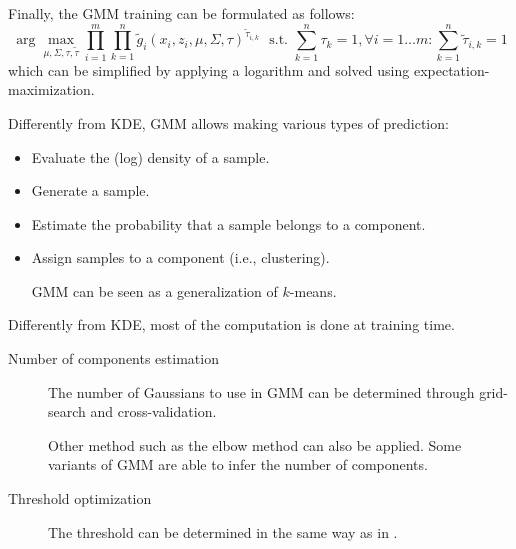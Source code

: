 \begin{description}
\begin{description}
            Finally, the GMM training can be formulated as follows:
            \[ \arg\max_{\mu, \Sigma, \tau, \tilde{\tau}} \prod_{i=1}^{m} \prod_{k=1}^{n} \tilde{g}_i(x_i, z_i, \mu, \Sigma, \tau)^{\tilde{\tau}_{i, k}} \,\,\text{ s.t. } \sum_{k=1}^{n} \tau_k = 1, \forall i =1\dots m: \sum_{k=1}^{n} \tilde{\tau}_{i, k} = 1 \]
            which can be simplified by applying a logarithm and solved using expectation-maximization.
        \end{description}
\end{description}

\begin{remark}
    Differently from KDE, GMM allows making various types of prediction:
    \begin{itemize}
        \item Evaluate the (log) density of a sample.
        \item Generate a sample.
        \item Estimate the probability that a sample belongs to a component.
        \item Assign samples to a component (i.e., clustering).
            \begin{remark}
                GMM can be seen as a generalization of $k$-means.
            \end{remark}
    \end{itemize}
\end{remark}


\begin{remark}
    Differently from KDE, most of the computation is done at training time.
\end{remark}


\begin{description}
    \item[Number of components estimation] 
        The number of Gaussians to use in GMM can be determined through grid-search and cross-validation.

        \begin{remark}
            Other method such as the elbow method can also be applied. Some variants of GMM are able to infer the number of components.
        \end{remark}

    \item[Threshold optimization]
        The threshold can be determined in the same way as in .
\end{description}



